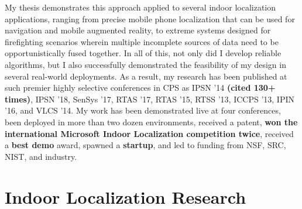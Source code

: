 \documentclass[10pt]{article}
\begin{document}
My thesis demonstrates this approach applied to several indoor localization applications, ranging from precise mobile phone localization that can be used for navigation and mobile augmented reality, to extreme systems designed for firefighting scenarios wherein multiple incomplete sources of data need to be opportunistically fused together. 
In all of this, not only did I develop reliable algorithms, but I also successfully demonstrated the feasibility of my design in several real-world deployments.
As a result, my research has been published at such premier highly selective conferences in CPS as IPSN '14 \textbf{(cited 130+ times)}, IPSN '18, SenSys '17, RTAS '17, RTAS '15,  RTSS '13, ICCPS '13, IPIN '16, and VLCS '14. My work has been demonstrated live at four conferences, been deployed in more than two dozen environments, received a patent, \textbf{won the international Microsoft Indoor Localization competition twice}, received a \textbf{best demo} award, spawned a \textbf{startup}, and led to funding from NSF, SRC, NIST, and industry.



\section{Indoor Localization Research}
\end{document}
